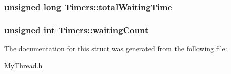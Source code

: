 \hypertarget{structTimers_a724d8fad61b1491b1cf5786f244f28af}{
\subsubsection[{total\-Waiting\-Time}]{\setlength{\rightskip}{0pt plus 5cm}unsigned long Timers\-::total\-Waiting\-Time}}\label{structTimers_a724d8fad61b1491b1cf5786f244f28af}
\hypertarget{structTimers_aec81485f4bce2b24c05d0063371300db}{
\subsubsection[{waiting\-Count}]{\setlength{\rightskip}{0pt plus 5cm}unsigned int Timers\-::waiting\-Count}}\label{structTimers_aec81485f4bce2b24c05d0063371300db}


The documentation for this struct was generated from the following file\-:\begin{DoxyCompactItemize}
\item 
\hyperlink{MyThread_8h}{My\-Thread.\-h}\end{DoxyCompactItemize}
